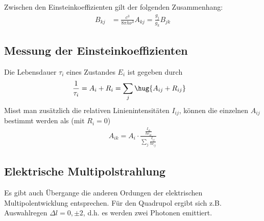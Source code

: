 \documentclass[twocolumn]{summery_4.1}
\begin{document}
Zwischen den Einsteinkoeffizienten gilt der folgenden Zusammenhang:
\begin{align*}
    B_{kj} &= \frac{c^3} {8\pi h \nu^3}A_{kj} =\frac{g_j}{g_k} B_{jk}
\end{align*}

\subsection{Messung der Einsteinkoeffizienten}
Die Lebensdauer \(\tau_i\) eines Zustandes \(E_i\) ist gegeben durch
\begin{align*}
    \frac{1}{\tau_i} &= A_i + R_i= \sum_j \hug{A_{ij} + R_{ij}}
\end{align*}
Misst man zusätzlich die relativen Linienintensitäten \(I_{ij}\), können die einzelnen \(A_{ij}\) bestimmt werden als (mit \(R_i = 0\))
\begin{align*}
    A_{ik} = A_i \cdot \frac{\frac{I_{ik}}{h\nu_{ik}}}{\sum_j \frac{I_{ij}}{h\nu_{ij}}}
\end{align*}

\subsection{Elektrische Multipolstrahlung}
Es gibt auch Übergange die anderen Ordungen der elektrischen Multipolentwicklung entsprechen.
Für den Quadrupol ergibt sich z.B. Auswahlregen \(\Delta l=0,\pm2\), d.h. es werden zwei Photonen emittiert.
\end{document}

